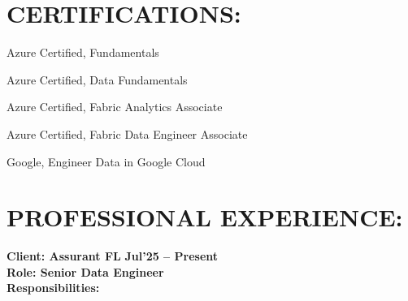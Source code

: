 \documentclass[a4paper,10pt]{article}
\begin{document}
\section*{CERTIFICATIONS:}
Azure Certified, Fundamentals

Azure Certified, Data Fundamentals

Azure Certified, Fabric Analytics Associate

Azure Certified, Fabric Data Engineer Associate

Google, Engineer Data in Google Cloud

\section*{PROFESSIONAL EXPERIENCE:}
\textbf{Client: Assurant FL} \hfill \textbf{Jul'25 – Present} \\
\textbf{Role: Senior Data Engineer} \\
\textbf{Responsibilities:}
\end{document}
